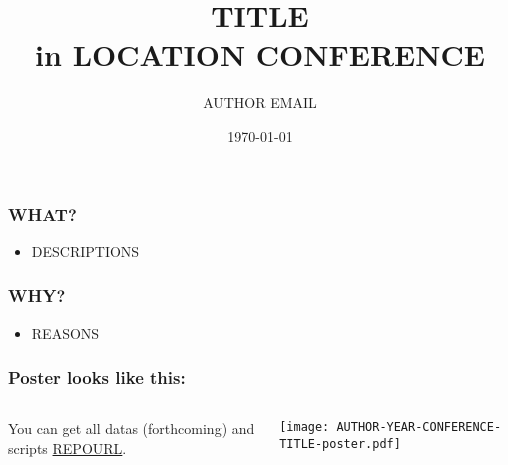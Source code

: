 \documentclass{beamer}
\title{TITLE\\
\scriptsize{in LOCATION CONFERENCE}}
\author{AUTHOR \scriptsize \guilsinglleft{}EMAIL\guilsinglright{}}
\institute{AFFILIATION1\\
AFFILIATION2}
\date{\today}
\begin{document}

\maketitle

\begin{frame}
    \frametitle{WHAT?}
    \begin{itemize}
        \item DESCRIPTIONS
    \end{itemize}
\end{frame}


\begin{frame}
    \frametitle{WHY?}
    \begin{itemize}
        \item REASONS
    \end{itemize}
\end{frame}

\begin{frame}
    \frametitle{Poster looks like this:}
    \begin{minipage}[0.2\textheight]{\textwidth}
\begin{columns}[T]
\begin{column}{0.8\textwidth}
    You can get all datas (forthcoming) and scripts \url{REPOURL}.
\end{column}
\begin{column}{0.2\textwidth}
    \texttt{[image: AUTHOR-YEAR-CONFERENCE-TITLE-poster.pdf]}
\end{column}
\end{columns}
\end{minipage}
\end{frame}
\end{document}
